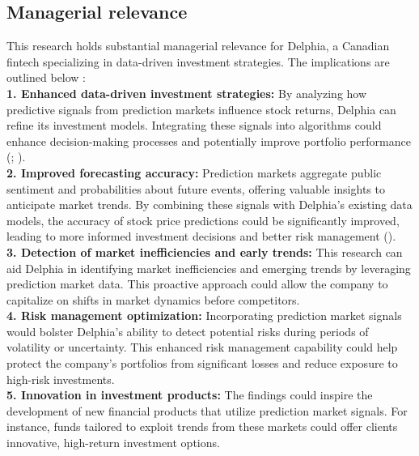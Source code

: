 \documentclass[12pt]{report}
\begin{document}
\newpage
\subsection{Managerial relevance}

This research holds substantial managerial relevance for Delphia, a Canadian fintech specializing in data-driven investment strategies. The implications are outlined below : \\

\textbf{1. Enhanced data-driven investment strategies:}  
By analyzing how predictive signals from prediction markets influence stock returns, Delphia can refine its investment models. Integrating these signals into algorithms could enhance decision-making processes and potentially improve portfolio performance (\cite{waitz_corporate_2013}; \cite{berg2003results}).\\

\textbf{2. Improved forecasting accuracy:}  
Prediction markets aggregate public sentiment and probabilities about future events, offering valuable insights to anticipate market trends. By combining these signals with Delphia's existing data models, the accuracy of stock price predictions could be significantly improved, leading to more informed investment decisions and better risk management (\cite{tetlock2007giving}).\\

\textbf{3. Detection of market inefficiencies and early trends:}  
This research can aid Delphia in identifying market inefficiencies and emerging trends by leveraging prediction market data. This proactive approach could allow the company to capitalize on shifts in market dynamics before competitors.\\

\textbf{4. Risk management optimization:}  
Incorporating prediction market signals would bolster Delphia's ability to detect potential risks during periods of volatility or uncertainty. This enhanced risk management capability could help protect the company's portfolios from significant losses and reduce exposure to high-risk investments.\\

\textbf{5. Innovation in investment products:}  
The findings could inspire the development of new financial products that utilize prediction market signals. For instance, funds tailored to exploit trends from these markets could offer clients innovative, high-return investment options.\\
\end{document}
